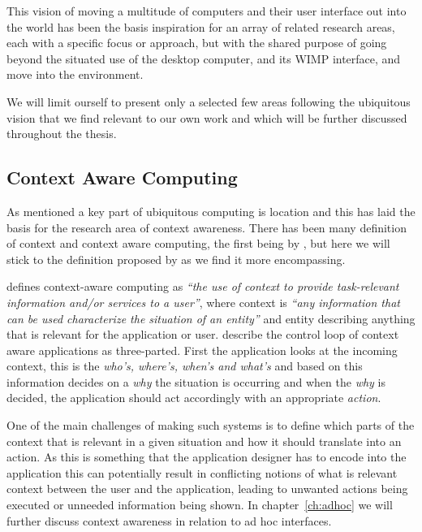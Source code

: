This vision of moving a multitude of computers and their user interface out into the world has been the basis inspiration for an array of related research areas, each with a specific focus or approach, but with the shared purpose of going beyond the situated use of the desktop computer, and its WIMP interface, and move into the environment.

We will limit ourself to present only a selected few areas following the ubiquitous vision that we find relevant to our own work and which will be further discussed throughout the thesis.

\subsection{Context Aware Computing}
As mentioned a key part of ubiquitous computing is location and this has laid the basis for the research area of context awareness.
There has been many definition of context and context aware computing, the first being by \citet{schilit1994context}, but here we will stick to the definition proposed by \citeauthor{abowd1999towards} as we find it more encompassing. 

\citet{abowd1999towards} defines context-aware computing as \emph{``the use of context to
provide task-relevant information and/or services to a user''}, where context is \emph{``any information that can be used characterize the situation of an entity''} and entity describing anything that is relevant for the application or user.
\citeauthor{abowd1999towards} describe the control loop of context aware applications as three-parted. 
First the application looks at the incoming context, this is the \emph{who's, where's, when's and what's} and based on this information decides on a \emph{why} the situation is occurring and when the \emph{why} is decided, the application should act accordingly with an appropriate \emph{action}.

One of the main challenges of making such systems is to define which parts of the context that is relevant in a given situation and how it should translate into an action. 
As this is something that the application designer has to encode into the application this can potentially result in conflicting notions of what is relevant context between the user and the application, leading to unwanted actions being executed or unneeded information being shown.
In chapter~\ref{ch:adhoc}  we will further discuss context awareness in relation to ad hoc interfaces. 


